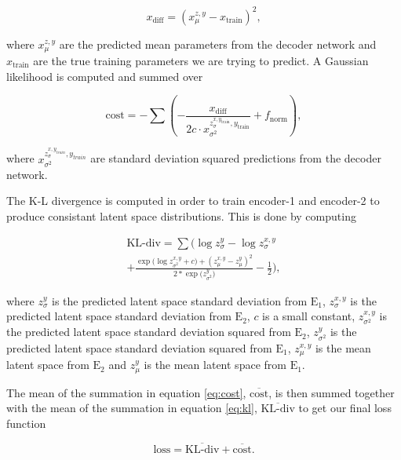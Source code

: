 \documentclass[%
showpacs,
 amsmath,amssymb,
 aps,
 twocolumn,
 prl,
 reprint,
floatfix,
]{revtex4-1}
\begin{document}
\begin{equation}
    x_{\textrm{diff}} = (x^{z,y}_{\mu} - x_{\textrm{train}})^{2},
\end{equation}

where $x^{z,y}_{\mu}$ are the predicted mean parameters from the decoder network 
and $x_{\textrm{train}}$ are the true training parameters we are 
trying to predict. A Gaussian likelihood is computed and summed over

\begin{equation}
    \textrm{cost} = - \sum (-\frac{x_{\textrm{diff}}}{2c \cdot 
    x^{z^{x,y_{\textrm{train}}}_{\sigma},y_{\textrm{train}}}_{\sigma^{2}}} + f_{\textrm{norm}}),\label{eq:cost}
\end{equation}

where $x^{z^{x,y_{train}}_{\sigma},y_{train}}_{\sigma^{2}}$ are standard deviation squared predictions from the 
decoder network.


%
%
The K-L divergence is computed in order to train 
encoder-1 and encoder-2 to produce consistant latent space 
distributions. This is done by computing 

\begin{equation}
    \begin{split}
    \textrm{KL-div} = \sum(\log{z^{y}_{\sigma}}-\log{z^{x,y}_{\sigma}} \\
    +\frac{\exp{(\log{z^{x,y}_{\sigma^{2}}+c)}}+(z^{x,y}_{\mu}-z^{y}_{\mu})^{2}}{2*\exp{(z^{y}_{\sigma^{2}}})}
    -\frac{1}{2}),\label{eq:kl}
    \end{split}
\end{equation}

where $z^{y}_{\sigma}$ is the predicted latent space standard deviation from $\textrm{E}_1$, 
$z^{x,y}_{\sigma}$ is the predicted latent space standard deviation from $\textrm{E}_2$, 
$c$ is a small constant, $z^{x,y}_{\sigma^{2}}$ is the predicted latent space 
standard deviation squared from $\textrm{E}_2$, $z^{y}_{\sigma^{2}}$ is the predicted 
latent space standard deviation squared from $\textrm{E}_1$, $z^{x,y}_{\mu}$ is the 
mean latent space from $\textrm{E}_2$ and $z^{y}_{\mu}$ is the mean latent space 
from $\textrm{E}_1$.

The mean of the summation in equation \ref{eq:cost}, $\overline{\textrm{cost}}$, 
is then summed together with the mean of the summation in equation \ref{eq:kl}, 
$\overline{\textrm{KL-div}}$ to 
get our final loss function

\begin{equation}
    \textrm{loss} = \overline{\textrm{KL-div}} + \overline{\textrm{cost}}.
\end{equation}
\end{document}
